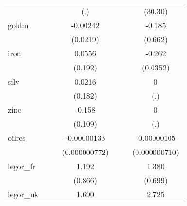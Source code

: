 {\begin{tabular}{l*{6}{c}}
            &                     &                     &         (.)         &                     &                     &     (30.30)         \\
[1em]
goldm       &                     &                     &    -0.00242         &                     &                     &      -0.185         \\
            &                     &                     &    (0.0219)         &                     &                     &     (0.662)         \\
[1em]
iron        &                     &                     &      0.0556         &                     &                     &      -0.262\sym{***}\\
            &                     &                     &     (0.192)         &                     &                     &    (0.0352)         \\
[1em]
silv        &                     &                     &      0.0216         &                     &                     &           0         \\
            &                     &                     &     (0.182)         &                     &                     &         (.)         \\
[1em]
zinc        &                     &                     &      -0.158         &                     &                     &           0         \\
            &                     &                     &     (0.109)         &                     &                     &         (.)         \\
[1em]
oilres      &                     &                     & -0.00000133         &                     &                     & -0.00000105         \\
            &                     &                     &(0.000000772)         &                     &                     &(0.000000710)         \\
[1em]
legor\_fr    &                     &                     &       1.192         &                     &                     &       1.380         \\
            &                     &                     &     (0.866)         &                     &                     &     (0.699)         \\
[1em]
legor\_uk    &                     &                     &       1.690\sym{*}  &                     &                     &       2.725\sym{***}\\

\end{tabular}}
